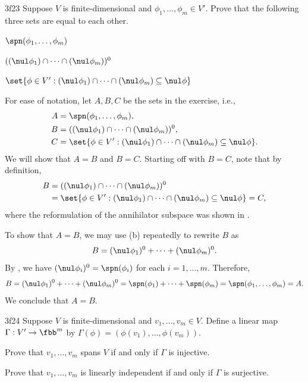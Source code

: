 \begin{exercise}{3f23}
    Suppose $V$ is finite-dimensional and $\phi_1, \ldots, \phi_m \in V'$.
	Prove that the following three sets are equal to each other.
    \begin{subexercises}
        \item $\spn(\phi_1, \ldots, \phi_m)$
        \item $((\nul \phi_1) \cap \cdots \cap (\nul \phi_m))^0$
        \item $\set{\phi \in V' : (\nul \phi_1) \cap \cdots \cap (\nul \phi_m) \subseteq \nul \phi}$
    \end{subexercises}
\end{exercise}

\begin{sol}
    For ease of notation, let $A, B, C$ be the sets in the exercise, i.e.,
    \begin{align*}
        A &= \spn(\phi_1, \ldots, \phi_m),\\
        B &= ((\nul \phi_1) \cap \cdots \cap (\nul \phi_m))^0,\\
        C &= \set{\phi \in V' : (\nul \phi_1) \cap \cdots \cap (\nul \phi_m) \subseteq \nul \phi}.
    \end{align*}
    We will show that $A = B$ and $B = C$.
	Starting off with $B = C$, note that by definition,
    \begin{align*}
        B &= ((\nul \phi_1) \cap \cdots \cap (\nul \phi_m))^0 \\
          &= \set{\phi \in V' : (\nul \phi_1) \cap \cdots \cap (\nul \phi_m) \subseteq \nul \phi} = C,
    \end{align*}
    where the reformulation of the annihilator subspace was shown in .

    To show that $A = B$, we may use  (b) repeatedly to rewrite $B$ as
    \[
    	B = (\nul \phi_1)^0 + \cdots + (\nul \phi_m)^0.
    \]
    By , we have $(\nul \phi_i)^0 = \spn(\phi_i)$ for each $i = 1, \ldots, m$.
	Therefore,
    \[
    	B = (\nul \phi_1)^0 + \cdots + (\nul \phi_m)^0 = \spn(\phi_1) + \cdots + \spn(\phi_m) = \spn(\phi_1, \ldots, \phi_m) = A.
    \]
    We conclude that $A = B$.
\end{sol}

\begin{exercise}{3f24}
    Suppose $V$ is finite-dimensional and $v_1, \ldots, v_m \in V$.
	Define a linear map $\Gamma: V' \to \fbb^m$ by $\Gamma(\phi) = (\phi(v_1), \ldots, \phi(v_m))$.
    \begin{subexercises}
        \item Prove that $v_1, \ldots, v_m$ spans $V$ if and only if $\Gamma$ is injective.
        \item Prove that $v_1, \ldots, v_m$ is linearly independent if and only if $\Gamma$ is surjective.
    \end{subexercises}
\end{exercise}

